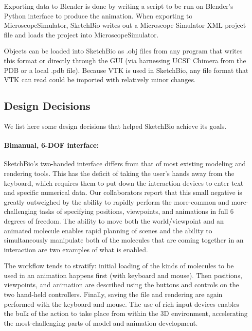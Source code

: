 \documentclass[twocolumn]{bmcart}%
\begin{document}
Exporting data to Blender is done by writing a script to be run on Blender's Python interface to produce the animation.
When exporting to MicroscopeSimulator, SketchBio writes out a Microscope Simulator XML project file and loads the project into MicroscopeSimulator.

Objects can be loaded into SketchBio as .obj files from any program that writes this format or directly through the GUI (via harnessing UCSF Chimera from the PDB or a local .pdb file).
Because VTK is used in SketchBio, any file format that VTK can read could be imported with relatively minor changes.

\subsection*{Design Decisions}
We list here some design decisions that helped SketchBio achieve its goals.

\paragraph*{Bimanual, 6-DOF interface:} SketchBio's two-handed interface differs from that of most existing modeling and rendering tools. This has the deficit of taking the user's hands away from the keyboard, which requires them to put down the interaction devices to enter text and specific numerical data. Our collaborators report that this small negative is greatly outweighed by the ability to rapidly perform the more-common and more-challenging tasks of specifying positions, viewpoints, and animations in full 6 degrees of freedom. The ability to move both the world/viewpoint and an animated molecule enables rapid planning of scenes and the ability to simultaneously manipulate both of the molecules that are coming together in an interaction are two examples of what is enabled.

The workflow tends to stratify: initial loading of the kinds of molecules to be used in an animation happens first (with keyboard and mouse). Then positions, viewpoints, and animation are described using the buttons and controls on the two hand-held controllers. Finally, saving the file and rendering are again performed with the keyboard and mouse. The use of rich input devices enables the bulk of the action to take place from within the 3D environment, accelerating the most-challenging parts of model and animation development.
\end{document}
